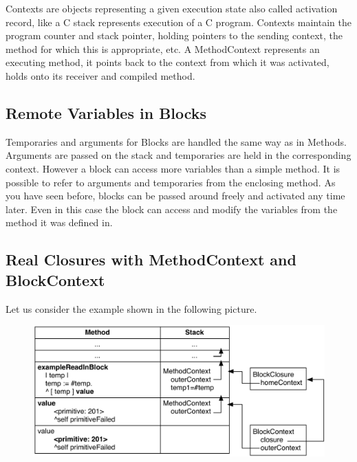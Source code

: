 \documentclass[a4paper,10pt,twoside]{book}
\begin{document}
Contexts are objects representing a given execution state also called activation record, like a C stack represents execution of a C program. Contexts maintain the program counter and stack pointer, holding pointers to the sending context, the method for which this is appropriate, etc. A MethodContext represents an executing method, it points back to the context from which it was activated, holds onto its receiver and compiled method.


\subsection{Remote Variables in Blocks}
Temporaries and arguments for Blocks are handled the same way as in Methods.
Arguments are passed on the stack and temporaries are held in the corresponding context.
However a block can access more variables than a simple method.
It is possible to refer to arguments and temporaries from the enclosing method.
As you have seen before, blocks can be passed around freely and activated any time later.
Even in this case the block can access and modify the variables from the method it was defined in.


\subsection{Real Closures with MethodContext and BlockContext}

Let us consider the example shown in the following picture.

\begin{figure}[H]
\begin{center}
\includegraphics[width=12cm]{BlockWithFullClosures}
\end{center}
\end{figure}
\end{document}
